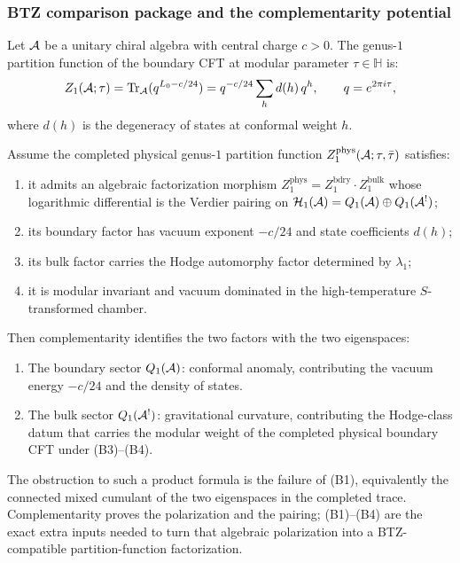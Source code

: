 \subsubsection{BTZ comparison package and the complementarity
potential}

\begin{theorem}
Let $\mathcal{A}$ be a unitary chiral algebra with central charge
$c > 0$. The genus-$1$ partition function of the boundary
CFT at modular parameter $\tau \in \mathbb{H}$ is:
\begin{equation}%
Z_1(\cA; \tau)
= \Tr_{\cA}(q^{L_0 - c/24})
= q^{-c/24} \sum_h d(h)\, q^h,
\qquad q = e^{2\pi i \tau},
\end{equation}
where $d(h)$ is the degeneracy of states at conformal
weight $h$.

Assume the completed physical genus-$1$ partition function
\(Z_1^{\mathrm{phys}}(\mathcal{A};\tau,\bar\tau)\) satisfies:
\begin{enumerate}[label=\textup{(B\arabic*)}]
\item it admits an algebraic factorization morphism
 \(Z_1^{\mathrm{phys}}=
  Z_1^{\mathrm{bdry}}\cdot Z_1^{\mathrm{bulk}}\)
 whose logarithmic differential is the Verdier pairing on
 \(\mathcal H_1(\mathcal{A})=Q_1(\mathcal{A})\oplus Q_1(\mathcal{A}^!)\);
\item its boundary factor has vacuum exponent \(-c/24\) and state
 coefficients \(d(h)\);
\item its bulk factor carries the Hodge automorphy factor determined
 by \(\lambda_1\);
\item it is modular invariant and vacuum dominated in the
 high-temperature \(S\)-transformed chamber.
\end{enumerate}
Then complementarity identifies the two factors with the two
eigenspaces:
\begin{enumerate}[label=\textup{(\alph*)}]
\item The boundary sector
 $Q_1(\mathcal{A})$: conformal anomaly, contributing the
 vacuum energy $-c/24$ and the density of states.
\item The bulk sector
 $Q_1(\mathcal{A}^!)$: gravitational curvature, contributing the
 Hodge-class datum that carries the modular weight of the completed
 physical boundary CFT under \textup{(B3)--(B4)}.
\end{enumerate}
The obstruction to such a product formula is the failure of
\textup{(B1)}, equivalently the connected mixed cumulant of the two
eigenspaces in the completed trace. Complementarity proves the
polarization and the pairing; \textup{(B1)--(B4)} are the exact extra
inputs needed to turn that algebraic polarization into a BTZ-compatible
partition-function factorization.
\end{theorem}


